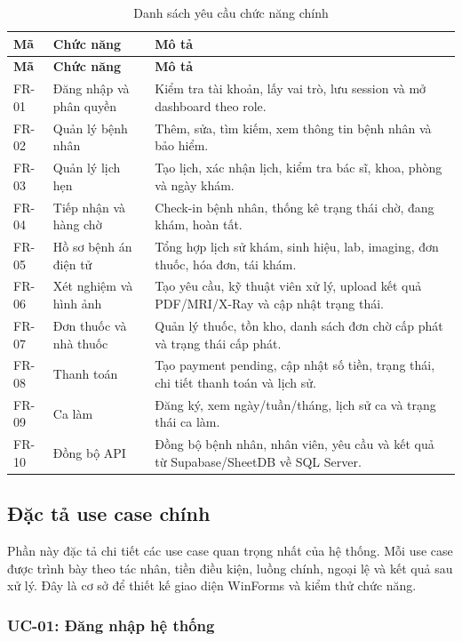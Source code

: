\documentclass[12pt,a4paper]{article}
\numberwithin{figure}{subsection}
\numberwithin{table}{subsection}
\begin{document}
\begin{longtable}{|p{2.1cm}|p{4.2cm}|p{7.7cm}|}
\caption{Danh sách yêu cầu chức năng chính} \\
\hline
\textbf{Mã} & \textbf{Chức năng} & \textbf{Mô tả} \\
\hline
\endfirsthead
\hline
\textbf{Mã} & \textbf{Chức năng} & \textbf{Mô tả} \\
\hline
\endhead
FR-01 & Đăng nhập và phân quyền & Kiểm tra tài khoản, lấy vai trò, lưu session và mở dashboard theo role. \\
\hline
FR-02 & Quản lý bệnh nhân & Thêm, sửa, tìm kiếm, xem thông tin bệnh nhân và bảo hiểm. \\
\hline
FR-03 & Quản lý lịch hẹn & Tạo lịch, xác nhận lịch, kiểm tra bác sĩ, khoa, phòng và ngày khám. \\
\hline
FR-04 & Tiếp nhận và hàng chờ & Check-in bệnh nhân, thống kê trạng thái chờ, đang khám, hoàn tất. \\
\hline
FR-05 & Hồ sơ bệnh án điện tử & Tổng hợp lịch sử khám, sinh hiệu, lab, imaging, đơn thuốc, hóa đơn, tái khám. \\
\hline
FR-06 & Xét nghiệm và hình ảnh & Tạo yêu cầu, kỹ thuật viên xử lý, upload kết quả PDF/MRI/X-Ray và cập nhật trạng thái. \\
\hline
FR-07 & Đơn thuốc và nhà thuốc & Quản lý thuốc, tồn kho, danh sách đơn chờ cấp phát và trạng thái cấp phát. \\
\hline
FR-08 & Thanh toán & Tạo payment pending, cập nhật số tiền, trạng thái, chi tiết thanh toán và lịch sử. \\
\hline
FR-09 & Ca làm & Đăng ký, xem ngày/tuần/tháng, lịch sử ca và trạng thái ca làm. \\
\hline
FR-10 & Đồng bộ API & Đồng bộ bệnh nhân, nhân viên, yêu cầu và kết quả từ Supabase/SheetDB về SQL Server. \\
\hline
\end{longtable}

\subsection{Đặc tả use case chính}

Phần này đặc tả chi tiết các use case quan trọng nhất của hệ thống. Mỗi use case được trình bày theo tác nhân, tiền điều kiện, luồng chính, ngoại lệ và kết quả sau xử lý. Đây là cơ sở để thiết kế giao diện WinForms và kiểm thử chức năng.

\subsubsection{UC-01: Đăng nhập hệ thống}
\end{document}
